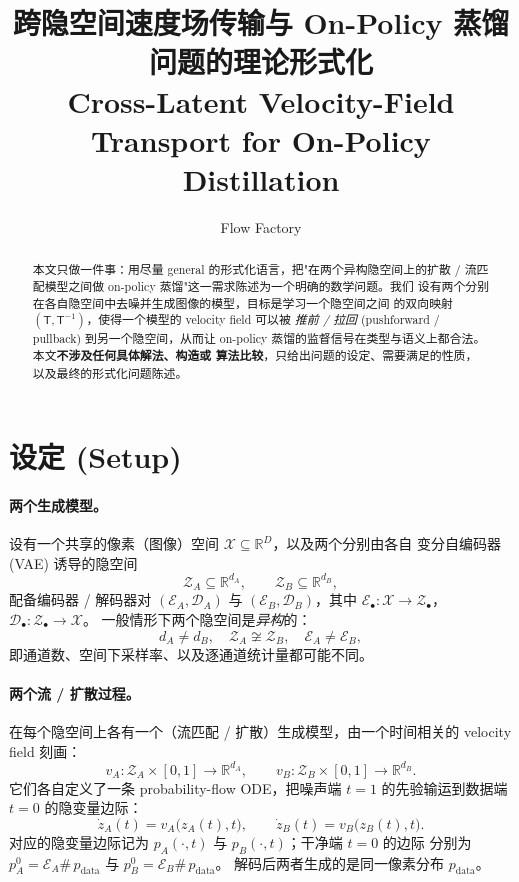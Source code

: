 \documentclass[11pt,a4paper]{article}
\title{\textbf{跨隐空间速度场传输与 On-Policy 蒸馏}\\[0.3em]
\large 问题的理论形式化 \\[0.3em]
\large Cross-Latent Velocity-Field Transport for On-Policy Distillation}
\author{Flow Factory}
\date{}
\newcommand{\R}{\mathbb{R}}
\newcommand{\Xspace}{\mathcal{X}}
\newcommand{\Za}{\mathcal{Z}_{A}}
\newcommand{\Zb}{\mathcal{Z}_{B}}
\newcommand{\Enc}{\mathcal{E}}
\newcommand{\Dec}{\mathcal{D}}
\newcommand{\Tmap}{\mathsf{T}}
\newcommand{\Tinv}{\mathsf{T}^{-1}}
\newcommand{\push}{\#}
\theoremstyle{definition}
\begin{document}
\maketitle

\begin{abstract}
本文只做一件事：用尽量 general 的形式化语言，把"在两个异构隐空间上的扩散
/ 流匹配模型之间做 on-policy 蒸馏"这一需求陈述为一个明确的数学问题。我们
设有两个分别在各自隐空间中去噪并生成图像的模型，目标是学习一个隐空间之间
的双向映射 $(\Tmap,\Tinv)$，使得一个模型的 velocity field 可以被
\emph{推前 / 拉回} (pushforward / pullback) 到另一个隐空间，从而让 on-policy
蒸馏的监督信号在类型与语义上都合法。本文\textbf{不涉及任何具体解法、构造或
算法比较}，只给出问题的设定、需要满足的性质，以及最终的形式化问题陈述。
\end{abstract}

\section{设定 (Setup)}
\label{sec:setup}

\paragraph{两个生成模型。}
设有一个共享的像素（图像）空间 $\Xspace\subseteq\R^{D}$，以及两个分别由各自
变分自编码器 (VAE) 诱导的隐空间
\[
\Za\subseteq\R^{d_A},\qquad \Zb\subseteq\R^{d_B},
\]
配备编码器 / 解码器对 $(\Enc_A,\Dec_A)$ 与 $(\Enc_B,\Dec_B)$，其中
$\Enc_\bullet:\Xspace\to\mathcal{Z}_\bullet$，$\Dec_\bullet:\mathcal{Z}_\bullet\to\Xspace$。
一般情形下两个隐空间是\emph{异构}的：
\[
d_A\neq d_B,\quad \Za\not\cong\Zb,\quad \Enc_A\neq\Enc_B,
\]
即通道数、空间下采样率、以及逐通道统计量都可能不同。

\paragraph{两个流 / 扩散过程。}
在每个隐空间上各有一个（流匹配 / 扩散）生成模型，由一个时间相关的
velocity field 刻画：
\[
v_A:\Za\times[0,1]\to\R^{d_A},
\qquad
v_B:\Zb\times[0,1]\to\R^{d_B}.
\]
它们各自定义了一条 probability-flow ODE，把噪声端 $t=1$ 的先验输运到数据端
$t=0$ 的隐变量边际：
\begin{equation}
\dot z_A(t) = v_A\big(z_A(t),t\big),
\qquad
\dot z_B(t) = v_B\big(z_B(t),t\big).
\label{eq:pf-ode}
\end{equation}
对应的隐变量边际记为 $p_A(\cdot,t)$ 与 $p_B(\cdot,t)$；干净端 $t=0$ 的边际
分别为 $p_A^{0}=\Enc_A\push\, p_{\mathrm{data}}$ 与 $p_B^{0}=\Enc_B\push\, p_{\mathrm{data}}$。
解码后两者生成的是同一像素分布 $p_{\mathrm{data}}$。
\end{document}
